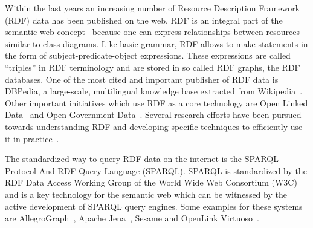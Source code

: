 Within the last years an increasing number of Resource Description Framework
(RDF) \cite{rdf} data has been published on the web. RDF is an integral part of
the semantic web concept~\cite{berners2001semantic}
because one can express relationships between resources similar to class
diagrams. Like basic grammar, RDF allows to make statements in the form of subject-predicate-object
expressions. These expressions are called ``triples'' in RDF terminology and are
stored in so called RDF graphs, the RDF databases.
One of the most cited and important publisher of
RDF data is DBPedia, a large-scale, multilingual knowledge base extracted from
Wikipedia~\cite{lehmann2015dbpedia}. Other important initiatives which use RDF
as a core technology are Open Linked Data~\cite{bizer2009linked,lee2006design}
and Open Government Data~\cite{datagov,datagovuk}. Several research efforts have been pursued
towards understanding RDF and developing specific techniques to efficiently use
it in practice~\cite{abadi2007scalable,weiss2008hexastore,
sidirourgos2008column,schmidt2008experimental,neumann2010rdf,gutierrez2004foundations,hogan2014everything}.

The standardized way to query RDF data on the internet is the SPARQL Protocol And
RDF Query Language (SPARQL).
SPARQL is standardized by the RDF Data Access Working Group of the World Wide
Web Consortium (W3C)~\cite{w3standard} and is a key technology for the
semantic web which can be witnessed by the active development of SPARQL query
engines. Some examples for these systems are AllegroGraph~\cite{allegro}, Apache
Jena~\cite{jena}, Sesame\cite{sesame}
and OpenLink Virtuoso~\cite{virtuoso}. 

